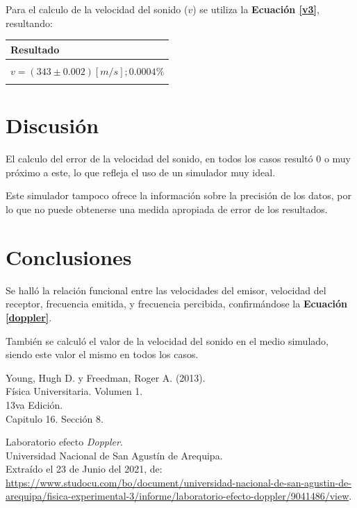 \documentclass[letter,11pt]{article}
\begin{document}
Para el calculo de la velocidad del sonido ($v$) se utiliza la
\textbf{Ecuación \ref{v3}}, resultando:

\begin{center}
\begin{tabular}{|>{\centering}m{9.2cm}<{\centering}|}
\hline
\textbf{Resultado} 
\tabularnewline \hline
\\
$v = (343 \pm 0.002) [m/s]; 0.0004\%$ \tabularnewline
\\
\hline
\end{tabular}
\end{center}

\section{Discusión}

El calculo del error de la velocidad del sonido, en todos los casos resultó 0 o
muy próximo a este, lo que refleja el uso de un simulador muy ideal.

Este simulador tampoco ofrece la información sobre la precisión de los datos,
por lo que no puede obtenerse una medida apropiada de error de los resultados.

\section{Conclusiones}

Se halló la relación funcional entre las velocidades del emisor, velocidad del
receptor, frecuencia emitida, y frecuencia percibida, confirmándose la
\textbf{Ecuación \ref{doppler}}.

También se calculó el valor de la velocidad del sonido en el medio simulado,
siendo este valor el mismo en todos los casos.

\begin{thebibliography}{99}

 Young, Hugh D. y Freedman, Roger A. (2013).\\
Física Universitaria. Volumen 1.\\
13va Edición.\\
Capitulo 16. Sección 8.

 Laboratorio efecto \emph{Doppler}.\\
Universidad Nacional de San Agustín de Arequipa. \\
Extraído el 23 de Junio del 2021, de:\\
{\small \url{https://www.studocu.com/bo/document/universidad-nacional-de-san-agustin-de-arequipa/fisica-experimental-3/informe/laboratorio-efecto-doppler/9041486/view}.}

\end{thebibliography}
\end{document}
